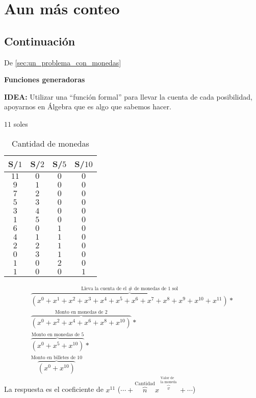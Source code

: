 \documentclass[../main.tex]{subfiles}
\begin{document}
\chapter{Aun más conteo}%

\thispagestyle{fancy}

\section{Continuación}%
\label{sec:continuacion}

De
\ref{sec:un_problema_con_monedas}

\textbf{Funciones generadoras}

{
	\Large \textbf{IDEA:}%
}
Utilizar una ``función formal'' para llevar la cuenta de cada posibilidad,
apoyarnos en Álgebra que es algo que sabemos hacer.

\begin{center}
	\Large $11$ soles
\end{center}

\begin{table}[H]
	\centering
	\begin{tabular}{|c|c|c|c|}
		S/$1$ & S/$2$ & S/$5$ & S/$10$\\
		\hline
		$11$ & $0$ & $0$ & $0$\\
		$9$ & $1$ & $0$ & $0$\\
		$7$ & $2$ & $0$ & $0$\\
		$5$ & $3$ & $0$ & $0$\\
		$3$ & $4$ & $0$ & $0$\\
		$1$ & $5$ & $0$ & $0$\\
		\hline
		$6$ & $0$ & $1$ & $0$\\
		$4$ & $1$ & $1$ & $0$\\
		$2$ & $2$ & $1$ & $0$\\
		$0$ & $3$ & $1$ & $0$\\
		\hline
		$1$ & $0$ & $2$ & $0$\\
		\hline
		$1$ & $0$ & $0$ & $1$
	\end{tabular}
	\caption{Cantidad de monedas}
\end{table}

\begin{gather*}
	\overbrace
	{
		(
		x^0
		+x^1
		+x^2
		+x^3
		+x^4
		+x^5
		+x^6
		+x^7
		+x^8
		+x^9
		+x^{10}
		+x^{11}
		)
	}^
	{
		\text{Lleva la cuenta de el $\#$ de monedas de $1$ sol}
	}
	*\\
	\overbrace
	{
		(
		x^0
		+x^2
		+x^4
		+x^6
		+x^8
		+x^{10}
		)
	}^
	{
		\text{Monto en monedas de $2$}
	}*\\
	\overbrace
	{
		(
		x^0
		+x^5
		+x^{10}
		)
	}^
	{
		\text{Monto en monedas de $5$}
	}*\\
	\overbrace
	{
		(
		x^0
		+x^{10}
		)
	}^
	{
		\text{Monto en billetes de $10$}
	}
\end{gather*}
La respuesta es el coeficiente de $x^{11}$
($\cdots+\overbrace{n}^{\text{Cantidad}}x^{\overbrace{v}^{\substack{\text{Valor de}\\
\text{la moneda}} }}+\cdots$)
\end{document}
